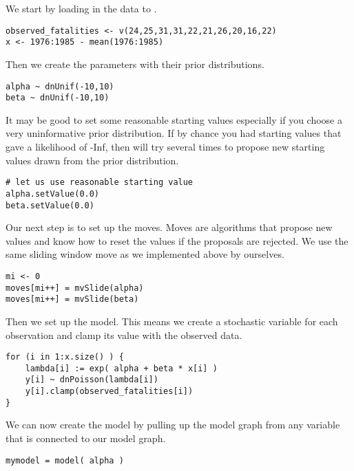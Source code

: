 We start by loading in the data to \RevBayes.
{\tt \begin{snugshade*}
\begin{lstlisting} 
observed_fatalities <- v(24,25,31,31,22,21,26,20,16,22)
x <- 1976:1985 - mean(1976:1985)
\end{lstlisting}
\end{snugshade*}}
Then we create the parameters with their prior distributions.
{\tt \begin{snugshade*}
\begin{lstlisting} 
alpha ~ dnUnif(-10,10) 
beta ~ dnUnif(-10,10)
\end{lstlisting}
\end{snugshade*}}
It may be good to set some reasonable starting values especially if you choose a very uninformative prior distribution.
If by chance you had starting values that gave a likelihood of -Inf, then \RevBayes will try several times to propose new starting values drawn from the prior distribution.
{\tt \begin{snugshade*}
\begin{lstlisting} 
# let us use reasonable starting value
alpha.setValue(0.0)
beta.setValue(0.0)
\end{lstlisting}
\end{snugshade*}}
Our next step is to set up the moves.
Moves are algorithms that propose new values and know how to reset the values if the proposals are rejected.
We use the same sliding window move as we implemented above by ourselves.
{\tt \begin{snugshade*}
\begin{lstlisting} 
mi <- 0
moves[mi++] = mvSlide(alpha)
moves[mi++] = mvSlide(beta)
\end{lstlisting}
\end{snugshade*}}
Then we set up the model.
This means we create a stochastic variable for each observation and clamp its value with the observed data.
{\tt \begin{snugshade*}
\begin{lstlisting} 
for (i in 1:x.size() ) {
    lambda[i] := exp( alpha + beta * x[i] )
    y[i] ~ dnPoisson(lambda[i])
    y[i].clamp(observed_fatalities[i])
}
\end{lstlisting}
\end{snugshade*}}
We can now create the model by pulling up the model graph from any variable that is connected to our model graph.
{\tt \begin{snugshade*}
\begin{lstlisting} 
mymodel = model( alpha )
\end{lstlisting}
\end{snugshade*}}
